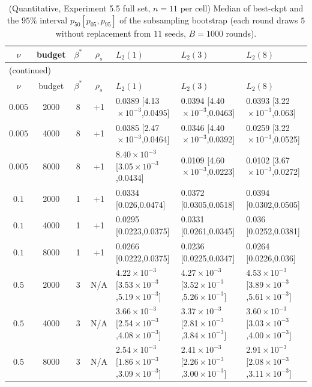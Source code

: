 \documentclass[11pt]{article}
\numberwithin{equation}{section}
\begin{document}
{\setlength{\tabcolsep}{1pt}%
\begin{longtable}{cccclll}
\caption{(Quantitative, Experiment 5.5 full set, $n=11$ per cell) Median of best-ckpt and the $95\%$ interval $p_{50}[p_{05},p_{95}]$ of the subsampling bootstrap (each round draws $5$ without replacement from $11$ seeds, $B=1000$ rounds).}\label{tab:app-r2}\\
\toprule
$\nu$ & budget & $\beta^*$ & $\rho_s$ & $L_2(1)$ & $L_2(3)$ & $L_2(8)$\\\midrule\endfirsthead
\multicolumn{7}{l}{\small (continued)}\\\toprule
$\nu$ & budget & $\beta^*$ & $\rho_s$ & $L_2(1)$ & $L_2(3)$ & $L_2(8)$\\\midrule\endhead
$0.005$ & 2000 & 8 & +1 & 0.0389 [4.13$\!\times\!10^{-3}$,0.0495] & 0.0394 [4.40$\!\times\!10^{-3}$,0.0463] & 0.0393 [3.22$\!\times\!10^{-3}$,0.063] \\
$0.005$ & 4000 & 8 & +1 & 0.0385 [2.47$\!\times\!10^{-3}$,0.0464] & 0.0346 [4.40$\!\times\!10^{-3}$,0.0392] & 0.0259 [3.22$\!\times\!10^{-3}$,0.0525] \\
$0.005$ & 8000 & 8 & +1 & 8.40$\!\times\!10^{-3}$ [3.05$\!\times\!10^{-3}$,0.0434] & 0.0109 [4.60$\!\times\!10^{-3}$,0.0223] & 0.0102 [3.67$\!\times\!10^{-3}$,0.0272] \\
$0.1$ & 2000 & 1 & +1 & 0.0334 [0.026,0.0474] & 0.0372 [0.0305,0.0518] & 0.0394 [0.0302,0.0505] \\
$0.1$ & 4000 & 1 & +1 & 0.0295 [0.0223,0.0375] & 0.0331 [0.0261,0.0345] & 0.036 [0.0252,0.0381] \\
$0.1$ & 8000 & 1 & +1 & 0.0266 [0.0222,0.0375] & 0.0236 [0.0225,0.0347] & 0.0264 [0.0226,0.036] \\
$0.5$ & 2000 & 3 & N/A & 4.22$\!\times\!10^{-3}$ [3.53$\!\times\!10^{-3}$,5.19$\!\times\!10^{-3}$] & 4.27$\!\times\!10^{-3}$ [3.52$\!\times\!10^{-3}$,5.26$\!\times\!10^{-3}$] & 4.53$\!\times\!10^{-3}$ [3.89$\!\times\!10^{-3}$,5.61$\!\times\!10^{-3}$] \\
$0.5$ & 4000 & 3 & N/A & 3.66$\!\times\!10^{-3}$ [2.54$\!\times\!10^{-3}$,4.08$\!\times\!10^{-3}$] & 3.37$\!\times\!10^{-3}$ [2.81$\!\times\!10^{-3}$,3.84$\!\times\!10^{-3}$] & 3.60$\!\times\!10^{-3}$ [3.03$\!\times\!10^{-3}$,4.00$\!\times\!10^{-3}$] \\
$0.5$ & 8000 & 3 & N/A & 2.54$\!\times\!10^{-3}$ [1.86$\!\times\!10^{-3}$,3.09$\!\times\!10^{-3}$] & 2.41$\!\times\!10^{-3}$ [2.26$\!\times\!10^{-3}$,3.00$\!\times\!10^{-3}$] & 2.91$\!\times\!10^{-3}$ [2.08$\!\times\!10^{-3}$,3.11$\!\times\!10^{-3}$]\\\bottomrule
\end{longtable}
}%
\end{document}
